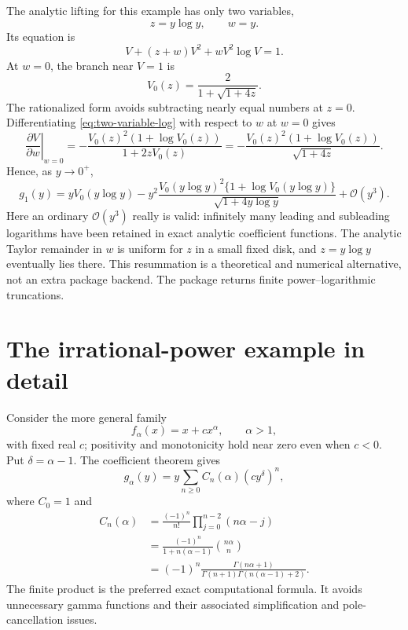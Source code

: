 \documentclass[11pt,a4paper]{article}
\numberwithin{equation}{section}
\theoremstyle{definition}\newtheorem{definition}[theorem]{Definition}
\theoremstyle{remark}\newtheorem{remark}[theorem]{Remark}
\newcommand{\OO}{\mathcal O}\newcommand{\dd}{\mathrm d}
\begin{document}
The analytic lifting for this example has only two variables,
\[
 z=y\log y,\qquad w=y.
\]
Its equation is
\begin{equation}
 V+(z+w)V^2+wV^2\log V=1.
 \label{eq:two-variable-log}
\end{equation}
At $w=0$, the branch near $V=1$ is
\begin{equation}
 V_0(z)=\frac{2}{1+\sqrt{1+4z}}.
 \label{eq:leading-log-sum}
\end{equation}
The rationalized form avoids subtracting nearly equal numbers at $z=0$.
Differentiating \cref{eq:two-variable-log} with respect to $w$ at $w=0$
gives
\[
 \left.\frac{\partial V}{\partial w}\right|_{w=0}
 =-\frac{V_0(z)^2(1+\log V_0(z))}{1+2zV_0(z)}
 =-\frac{V_0(z)^2(1+\log V_0(z))}{\sqrt{1+4z}}.
\]
Hence, as $y\to0^+$,
\begin{equation}
 g_1(y)=yV_0(y\log y)
 -y^2\frac{V_0(y\log y)^2\{1+\log V_0(y\log y)\}}
               {\sqrt{1+4y\log y}}
 +\OO(y^3).
 \label{eq:resummed-log}
\end{equation}
Here an ordinary $\OO(y^3)$ really is valid: infinitely many leading and
subleading logarithms have been retained in exact analytic coefficient
functions. The analytic Taylor remainder in $w$ is uniform for $z$ in a
small fixed disk, and $z=y\log y$ eventually lies there. This resummation
is a theoretical and numerical alternative, not an extra package backend.
The package returns finite power--logarithmic truncations.

\section{The irrational-power example in detail}
\label{sec:irrational}

Consider the more general family
\begin{equation}
 f_\alpha(x)=x+c x^\alpha,\qquad \alpha>1,
 \label{eq:pure-family}
\end{equation}
with fixed real $c$; positivity and monotonicity hold near zero even when
$c<0$. Put $\delta=\alpha-1$. The coefficient theorem gives
\begin{equation}
 g_\alpha(y)=y\sum_{n\ge0}C_n(\alpha)(c y^\delta)^n,
 \label{eq:pure-series}
\end{equation}
where $C_0=1$ and
\begin{align}
 C_n(\alpha)
 &=\frac{(-1)^n}{n!}\prod_{j=0}^{n-2}(n\alpha-j)\label{eq:pure-product}\\
 &=\frac{(-1)^n}{1+n(\alpha-1)}\binom{n\alpha}{n}\label{eq:pure-binomial}\\
 &=(-1)^n\frac{\Gamma(n\alpha+1)}
                 {\Gamma(n+1)\Gamma(n(\alpha-1)+2)}.
 \label{eq:pure-gamma}
\end{align}
The finite product is the preferred exact computational formula. It
avoids unnecessary gamma functions and their associated simplification
and pole-cancellation issues.
\end{document}
